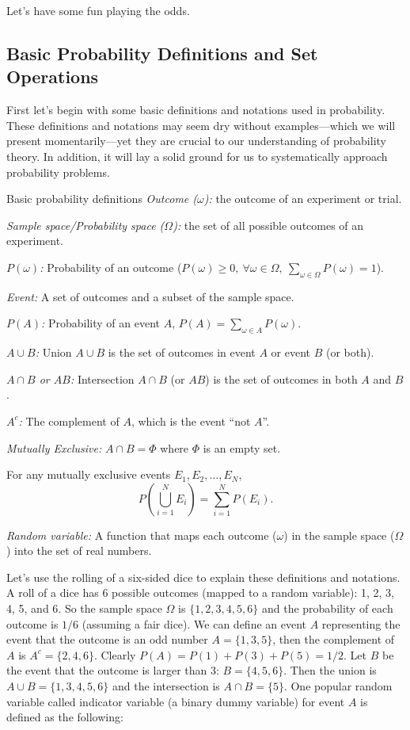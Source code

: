 Let's have some fun playing the odds.

\subsection{Basic Probability Definitions and Set Operations}

First let's begin with some basic definitions and notations used in probability. These
definitions and notations may seem dry without examples---which we will present
momentarily---yet they are crucial to our understanding of probability theory. In addition,
it will lay a solid ground for us to systematically approach probability problems.

\begin{concept}{Basic probability definitions}
\noindent\emph{Outcome ($\omega$):} the outcome of an experiment or trial.

\noindent\emph{Sample space/Probability space ($\Omega$):} the set of all possible outcomes
of an experiment.

\noindent\emph{$P(\omega)$:} Probability of an outcome ($P(\omega)\ge 0,\ \forall\omega\in\Omega,
\ \sum_{\omega\in\Omega}P(\omega)=1$).

\noindent\emph{Event:} A set of outcomes and a subset of the sample space.

\noindent\emph{$P(A)$:} Probability of an event $A$, $P(A)=\sum_{\omega\in A}P(\omega)$.

\noindent\emph{$A\cup B$:} Union $A\cup B$ is the set of outcomes in event $A$ or event $B$
(or both).

\noindent\emph{$A\cap B$ or $AB$:} Intersection $A\cap B$ (or $AB$) is the set of outcomes in
both $A$ and $B$.

\noindent\emph{$A^c$:} The complement of $A$, which is the event ``not $A$''.

\noindent\emph{Mutually Exclusive:} $A\cap B=\Phi$ where $\Phi$ is an empty set.

For any mutually exclusive events $E_1,E_2,\ldots,E_N$,
\[
P\left(\bigcup_{i=1}^{N}E_i\right)=\sum_{i=1}^{N}P(E_i).
\]

\noindent\emph{Random variable:} A function that maps each outcome ($\omega$) in the
sample space ($\Omega$) into the set of real numbers.
\end{concept}

Let's use the rolling of a six-sided dice to explain these definitions and notations. A roll
of a dice has 6 possible outcomes (mapped to a random variable): 1, 2, 3, 4, 5, and 6. So
the sample space $\Omega$ is $\{1,2,3,4,5,6\}$ and the probability of each outcome is $1/6$
(assuming a fair dice). We can define an event $A$ representing the event that the outcome
is an odd number $A=\{1,3,5\}$, then the complement of $A$ is $A^c=\{2,4,6\}$. Clearly
$P(A)=P(1)+P(3)+P(5)=1/2$. Let $B$ be the event that the outcome is larger than 3:
$B=\{4,5,6\}$. Then the union is $A\cup B=\{1,3,4,5,6\}$ and the intersection is
$A\cap B=\{5\}$. One popular random variable called indicator variable (a binary dummy
variable) for event $A$ is defined as the following:


